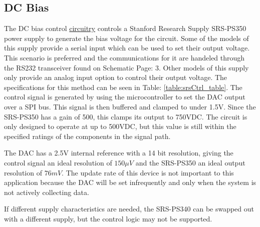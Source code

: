 \subsection {DC Bias}
\label{sec:dcBias}

The DC bias control \hyperlink{sch:dcBias}{circuitry} controls a Stanford Research Supply SRS-PS350 power supply to generate the bias voltage for the circuit. Some of the models of this supply provide a serial input which can be used to set their output voltage. This scenario is preferred and the communications for it are handeled through the RS232 transceiver found on Schematic Page: 3. Other models of this supply only provide an analog input option to control their output voltage. The specifications for this method can be seen in Table: \ref{table:srsCtrl_table}. The control signal is generated by using the microcontroller to set the DAC output over a SPI bus. This signal is then buffered and clamped to under 1.5V. Since the SRS-PS350 has a gain of 500, this clamps its output to 750VDC. The circuit is only designed to operate at up to 500VDC, but this value is still within the specified ratings of the components in the signal path.



The DAC has a 2.5V internal reference with a 14 bit resolution, giving the control signal an ideal resolution of $150\mu V$ and the SRS-PS350 an ideal output resolution of $76mV$. The update rate of this device is not important to this application because the DAC will be set infrequently and only when the system is not actively collecting data.

If different supply characteristics are needed, the SRS-PS340 can be swapped out with a different supply, but the control logic may not be supported.

